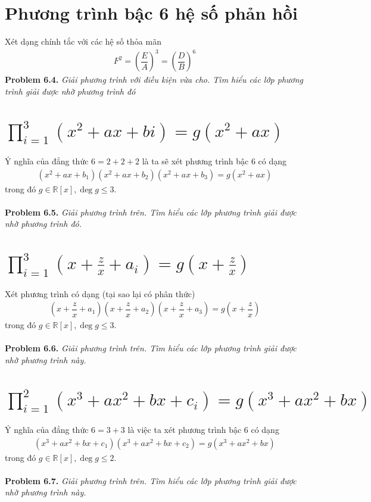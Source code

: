 \documentclass[a4paper,oneside]{book}
\numberwithin{equation}{chapter}
\begin{document}
\section{Phương trình bậc 6 hệ số phản hồi}
Xét dạng chính tắc với các hệ số thỏa mãn
\begin{align}
{F^2} = {\left( {\dfrac{E}{A}} \right)^3} = {\left( {\dfrac{D}{B}} \right)^6}
\end{align}
\textbf{Problem 6.4.} \textit{Giải phương trình với điều kiện vừa cho. Tìm hiểu các lớp phương trình giải được nhờ phương trình đó}
\section{$\prod\limits_{i = 1}^3 {\left( {{x^2} + ax + {bi}} \right)}  = g\left( {{x^2} + ax} \right)$}
Ý nghĩa của đẳng thức $6=2+2+2$ là ta sẽ xét phương trình bậc 6 có dạng
\begin{align}
\left( {{x^2} + ax + {b_1}} \right)\left( {{x^2} + ax + {b_2}} \right)\left( {{x^2} + ax + {b_3}} \right) = g\left( {{x^2} + ax} \right)
\end{align}
trong đó $g \in \mathbb{R} \left[ x \right],\deg g \le 3$.\\
\\
\textbf{Problem 6.5.} \textit{Giải phương trình trên. Tìm hiểu các lớp phương trình giải được nhờ phương trình đó.}
\section{$\prod\limits_{i = 1}^3 {\left( {x + \frac{z}{x} + {a_i}} \right)}  = g\left( {x + \frac{z}{x}} \right)$}
Xét phương trình có dạng (tại sao lại có phân thức)
\begin{align}
\left( {x + \dfrac{z}{x} + {a_1}} \right)\left( {x + \dfrac{z}{x} + {a_2}} \right)\left( {x + \dfrac{z}{x} + {a_3}} \right) = g\left( {x + \dfrac{z}{x}} \right)
\end{align}
trong đó $g \in \mathbb{R} \left[ x \right],\deg g \le 3$.\\
\\
\textbf{Problem 6.6.} \textit{Giải phương trình trên. Tìm hiểu các lớp phương trình giải được nhờ phương trình này.}
\section{$\prod\limits_{i = 1}^2 {\left( {{x^3} + a{x^2} + bx + {c_i}} \right)}  = g\left( {{x^3} + a{x^2} + bx} \right)$}
Ý nghĩa của đẳng thức $6=3+3$ là việc ta xét phương trình bậc 6 có dạng
\begin{align}
\left( {{x^3} + a{x^2} + bx + {c_1}} \right)\left( {{x^3} + a{x^2} + bx + {c_2}} \right) = g\left( {{x^3} + a{x^2} + bx} \right)
\end{align}
trong đó $g \in \mathbb{R} \left[ x \right],\deg g \le 2$.\\
\\
\textbf{Problem 6.7.} \textit{Giải phương trình trên. Tìm hiểu các lớp phương trình giải được nhờ phương trình này.}
\end{document}
